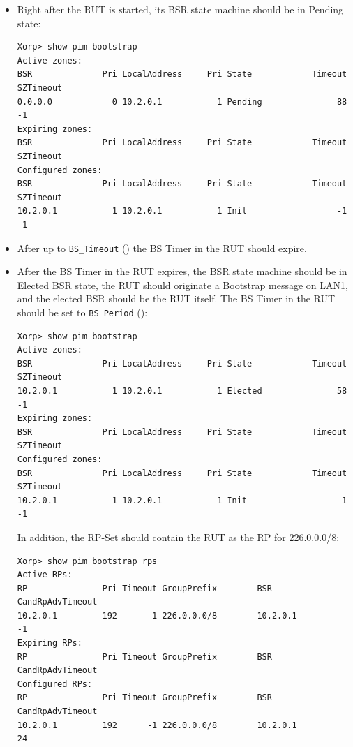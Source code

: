 \documentclass[11pt]{report}
\begin{document}
\begin{itemize}

  \item Right after the RUT is started, its BSR state machine should be in
  Pending state:

\begin{verbatim}
Xorp> show pim bootstrap 
Active zones:
BSR              Pri LocalAddress     Pri State            Timeout SZTimeout
0.0.0.0            0 10.2.0.1           1 Pending               88        -1
Expiring zones:
BSR              Pri LocalAddress     Pri State            Timeout SZTimeout
Configured zones:
BSR              Pri LocalAddress     Pri State            Timeout SZTimeout
10.2.0.1           1 10.2.0.1           1 Init                  -1        -1
\end{verbatim}

  \item After up to \verb=BS_Timeout= ({\PimsmBSTimeout}) the BS Timer
  in the RUT should expire.

  \item After the BS Timer in the RUT expires, the BSR state machine should be
  in Elected BSR state, the RUT should originate a Bootstrap message on LAN1,
  and the elected BSR should be the RUT itself.
  The BS Timer in the RUT should be set to \verb=BS_Period=
  ({\PimsmBSPeriod}):

\begin{verbatim}
Xorp> show pim bootstrap 
Active zones:
BSR              Pri LocalAddress     Pri State            Timeout SZTimeout
10.2.0.1           1 10.2.0.1           1 Elected               58        -1
Expiring zones:
BSR              Pri LocalAddress     Pri State            Timeout SZTimeout
Configured zones:
BSR              Pri LocalAddress     Pri State            Timeout SZTimeout
10.2.0.1           1 10.2.0.1           1 Init                  -1        -1
\end{verbatim}

  In addition, the RP-Set should contain the RUT as the RP for 226.0.0.0/8:

\begin{verbatim}
Xorp> show pim bootstrap rps 
Active RPs:
RP               Pri Timeout GroupPrefix        BSR         CandRpAdvTimeout
10.2.0.1         192      -1 226.0.0.0/8        10.2.0.1                  -1
Expiring RPs:
RP               Pri Timeout GroupPrefix        BSR         CandRpAdvTimeout
Configured RPs:
RP               Pri Timeout GroupPrefix        BSR         CandRpAdvTimeout
10.2.0.1         192      -1 226.0.0.0/8        10.2.0.1                  24
\end{verbatim}


\end{itemize}
\end{document}
